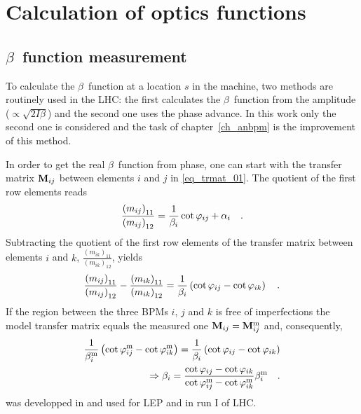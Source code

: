 
\section{Calculation of optics functions}

\subsection{\texorpdfstring{$\beta$}{beta}~function measurement}
\label{sec_beta_meas}

To calculate the $\beta$~function at a location $s$ in the machine, two methods are routinely used
in the LHC: the first calculates the $\beta$~function from the amplitude ($\propto \sqrt{2I\beta}$)
and the second one uses the phase advance.
In this work only the second one is considered and the task of chapter~\ref{ch_anbpm} is the improvement
of this method.

In order to get the real $\beta$~function from phase, one can start with the transfer matrix $\mathbf{M}_{ij}$
between elements $i$ and $j$ in \eqref{eq_trmat_01}.
The quotient of the first row elements reads 
%
\begin{equation}
    \frac{\left(m_{ij}\right)_{11}}{\left(m_{ij}\right)_{12}} =
    \frac{1}{\beta_i} \cot\varphi_{ij} + \alpha_i
    \quad .
    \label{eq_trmat_quot}
\end{equation}
%
Subtracting the quotient of the first row elements of the transfer matrix between elements $i$ and $k$,
$ \frac{\left(m_{ik}\right)_{11}}{\left(m_{ik}\right)_{12}}$, yields
%
\begin{equation}
    \frac{\left(m_{ij}\right)_{11}}{\left(m_{ij}\right)_{12}} - \frac{\left(m_{ik}\right)_{11}}{\left(m_{ik}\right)_{12}}
    =
    \frac{1}{\beta_i} \left( \cot\varphi_{ij} - \cot\varphi_{ik}\right)
    \quad .
\end{equation}
%
If the region between the three BPMs $i$, $j$ and $k$ is free of imperfections
the model transfer matrix equals the measured one
$\mathbf{M}_{ij} = \mathbf{M}_{ij}^\text{m}$ and, consequently,
%
\begin{align}
    \frac{1}{\beta_i^\text{m}} \left( \cot\varphi_{ij}^\text{m} - \cot \varphi_{ik}^\text{m} \right)
    =
    \frac{1}{\beta_i} \left( \cot\varphi_{ij} - \cot \varphi_{ik} \right) \notag \\
    \Rightarrow
    \beta_i = \frac{
        \cot\varphi_{ij} - \cot\varphi_{ik}
    }{
        \cot\varphi_{ij}^\text{m} - \cot\varphi_{ik}^\text{m}
    }
    \beta_i^\text{m}
    \quad .
    \label{eq_3bpm_method}
\end{align}
%
 was developped in \cite{Castro1996} and used for LEP and in run I of LHC.

